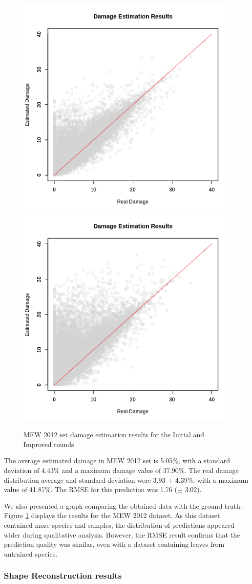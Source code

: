 \begin{figure}[h!]
    \centering
    \includegraphics[width = .45\linewidth]{Figures/v1-mew2012-estm.png}
    \includegraphics[width = .45\linewidth]{Figures/v2-mew2012-estm.png}
    \caption{MEW 2012 set damage estimation results for the Initial and Improved rounds}
    \label{fig:mew2012_results}
\end{figure}

The average estimated damage in MEW 2012 set is 5.05\%, with a standard deviation of 4.43\% and a maximum damage value of 37.90\%. The real damage distribution average and standard deviation were 3.93 $\pm$ 4.39\%, with a maximum value of 41.87\%. The RMSE for this prediction was 1.76 ($\pm$ 3.02).

We also presented a graph comparing the obtained data with the ground truth. Figure \ref{fig:mew2012_results} displays the results for the MEW 2012 dataset. As this dataset contained more species and samples, the distribution of predictions appeared wider during qualitative analysis. However, the RMSE result confirms that the prediction quality was similar, even with a dataset containing leaves from untrained species.


\subsubsection{Shape Reconstruction results}

